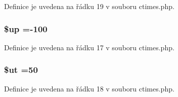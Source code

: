Definice je uvedena na řádku 19 v souboru ctimes.\-php.

\hypertarget{ctimes_8php_a6b5ad2ac55f9df46e8f34e78fbd6f176}{
\subsubsection[{\$up}]{\setlength{\rightskip}{0pt plus 5cm}\$up =-\/100}}\label{ctimes_8php_a6b5ad2ac55f9df46e8f34e78fbd6f176}


Definice je uvedena na řádku 17 v souboru ctimes.\-php.

\hypertarget{ctimes_8php_aadd3f841051043ee58e587e840e8dd0b}{
\subsubsection[{\$ut}]{\setlength{\rightskip}{0pt plus 5cm}\$ut =50}}\label{ctimes_8php_aadd3f841051043ee58e587e840e8dd0b}


Definice je uvedena na řádku 18 v souboru ctimes.\-php.

